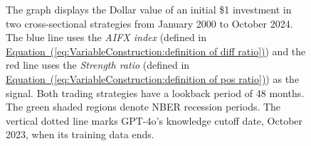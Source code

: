 \documentclass[12pt,oneside,letter]{article}
\newcommand*{\myeq}[1]{\hyperref[{#1}]{Equation~(\ref*{#1})}}
\begin{document}
\begin{landscape}
\begin{figure}
\begin{center}
{
}
		    \medskip
		     \label{fig:Performance:cs strategy performance over time 48 months diff positive}
	    \end{center}
	
	
	    \begin{small}
	    The graph displays the Dollar value of an initial \$1 investment in two cross-sectional strategies from January 2000 to October 2024. The blue line uses the \textit{AIFX index} (defined in \myeq{eq:VariableConstruction:definition of diff ratio}) and the red line uses the \textit{Strength ratio} (defined in \myeq{eq:VariableConstruction:definition of pos ratio}) as the signal. Both trading strategies have a lookback period of 48 months. The green shaded regions denote NBER recession periods. The vertical dotted line marks GPT-4o’s knowledge cutoff date, October 2023, when its training data ends.
	    \end{small}


	\end{figure}

\end{landscape}
\end{document}
